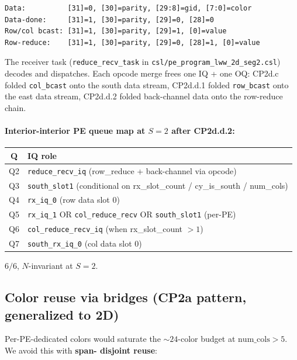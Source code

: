 \documentclass[11pt]{article}
\newcommand{\code}[1]{\texttt{#1}}
\newcommand{\file}[1]{\texttt{#1}}
\begin{document}
\begin{lstlisting}
Data:          [31]=0, [30]=parity, [29:8]=gid, [7:0]=color
Data-done:     [31]=1, [30]=parity, [29]=0, [28]=0
Row/col bcast: [31]=1, [30]=parity, [29]=1, [0]=value
Row-reduce:    [31]=1, [30]=parity, [29]=0, [28]=1, [0]=value
\end{lstlisting}

The receiver task (\code{reduce\_recv\_task} in
\file{csl/pe\_program\_lww\_2d\_seg2.csl}) decodes and dispatches.
Each opcode merge frees one IQ + one OQ: CP2d.c folded
\code{col\_bcast} onto the south data stream, CP2d.d.1 folded
\code{row\_bcast} onto the east data stream, CP2d.d.2 folded
back-channel data onto the row-reduce chain.

\paragraph{Interior-interior PE queue map at $S=2$ after CP2d.d.2:}
\begin{center}
\begin{tabular}{cl}
\toprule
Q & IQ role \\
\midrule
Q2 & \code{reduce\_recv\_iq} (row\_reduce + back-channel via opcode) \\
Q3 & \code{south\_slot1} (conditional on rx\_slot\_count / cy\_is\_south / num\_cols) \\
Q4 & \code{rx\_iq\_0} (row data slot 0) \\
Q5 & \code{rx\_iq\_1} OR \code{col\_reduce\_recv} OR \code{south\_slot1} (per-PE) \\
Q6 & \code{col\_reduce\_recv\_iq} (when rx\_slot\_count $> 1$) \\
Q7 & \code{south\_rx\_iq\_0} (col data slot 0) \\
\bottomrule
\end{tabular}
\end{center}

$6/6$, $N$-invariant at $S=2$.

\subsection{Color reuse via bridges (CP2a pattern, generalized to 2D)}
Per-PE-dedicated colors would saturate the $\sim\!24$-color budget
at $\mathrm{num\_cols} > 5$. We avoid this with \textbf{span-
disjoint reuse}:
\end{document}
